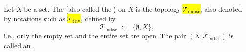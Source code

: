 \begin{definition} \label{definition:trivial_topological_space_of_a_set}
Let $X$ be a set. The  (also called the ) on $X$ is the topology \hl{$\mathcal{T}_{\mathrm{indisc}}$}, also denoted by notations such as \hl{$\mathcal{T}_{\mathrm{triv}}$}, defined by
\[
\mathcal{T}_{\mathrm{indisc}} \;:=\; \{ \emptyset, X \},
\]
i.e., only the empty set and the entire set are open. The pair $(X, \mathcal{T}_{\mathrm{indisc}})$ is called an .
\end{definition}
